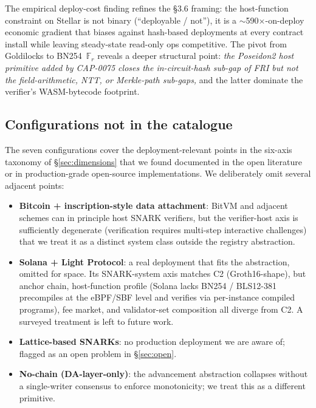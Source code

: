 The empirical deploy-cost finding refines the §3.6 framing: the
host-function constraint on Stellar is not binary
(``deployable / not''), it is a $\sim$590$\times$-on-deploy economic
gradient that biases against hash-based deployments at every
contract install while leaving steady-state read-only ops competitive.
The pivot from Goldilocks to BN254~$\mathbb{F}_r$ reveals a deeper
structural point: \emph{the Poseidon2 host primitive added by
CAP-0075 closes the in-circuit-hash sub-gap of FRI but not the
field-arithmetic, NTT, or Merkle-path sub-gaps,} and the latter
dominate the verifier's WASM-bytecode footprint.

\subsection{Configurations not in the catalogue}

The seven configurations cover the deployment-relevant points in the
six-axis taxonomy of \S\ref{sec:dimensions} that we found documented
in the open literature or in production-grade open-source
implementations. We deliberately omit several adjacent points:

\begin{itemize}
  \item \textbf{Bitcoin + inscription-style data attachment}: BitVM
    and adjacent schemes can in principle host SNARK verifiers, but
    the verifier-host axis is sufficiently degenerate (verification
    requires multi-step interactive challenges) that we treat it as a
    distinct system class outside the registry abstraction.
  \item \textbf{Solana + Light Protocol}: a real deployment that
    fits the abstraction, omitted for space. Its SNARK-system axis
    matches C2 (Groth16-shape), but anchor chain, host-function
    profile (Solana lacks BN254 / BLS12-381 precompiles at the
    eBPF/SBF level and verifies via per-instance compiled programs),
    fee market, and validator-set composition all diverge from C2.
    A surveyed treatment is left to future work.
  \item \textbf{Lattice-based SNARKs}: no production deployment we
    are aware of; flagged as an open problem in \S\ref{sec:open}.
  \item \textbf{No-chain (DA-layer-only)}: the
    advancement abstraction collapses without a single-writer
    consensus to enforce monotonicity; we treat this as a different
    primitive.
\end{itemize}

